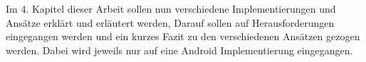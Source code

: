 Im 4. Kapitel dieser Arbeit sollen nun verschiedene Implementierungen und Ansätze erklärt und erläutert werden, Darauf sollen auf Herausforderungen eingegangen werden und ein kurzes Fazit zu den verschiedenen Ansätzen gezogen werden. Dabei wird jeweils nur auf eine Android Implementierung eingegangen. 